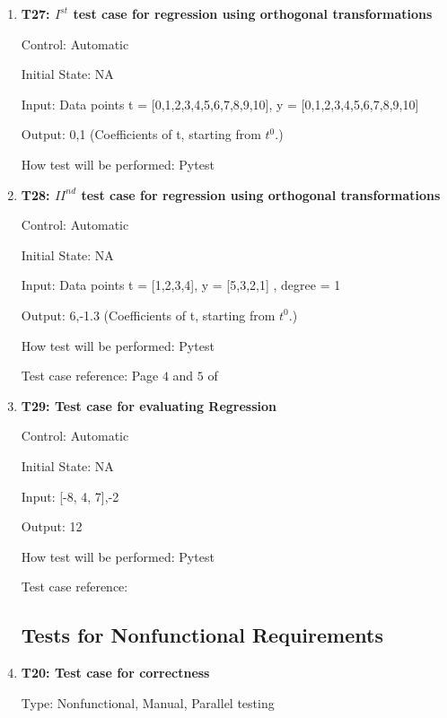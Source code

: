 \documentclass[12pt, titlepage]{article}
\begin{document}
\begin{enumerate}
\item{\textbf{T27: ${I}^{st}$ test case for regression using orthogonal 
transformations}\\}

Control: Automatic

Initial State: NA

Input: Data points t = [0,1,2,3,4,5,6,7,8,9,10], y = [0,1,2,3,4,5,6,7,8,9,10] 

Output: 0,1 (Coefficients of t, starting from $t^{0}$.)

How test will be performed: Pytest\\


\item{\textbf{T28: ${II}^{nd}$ test case for regression using orthogonal 
transformations}\\}

Control: Automatic

Initial State: NA

Input: Data points t = [1,2,3,4], y = [5,3,2,1] , degree = 1

Output: 6,-1.3 (Coefficients of t, starting from $t^{0}$.)

How test will be performed: Pytest

Test case reference: Page $4$ and $5$ of \cite{RegOrthogonal}\\

\item{\textbf{T29: Test case for evaluating Regression}}

Control: Automatic

Initial State: NA

Input: [-8, 4, 7],-2

Output: 12

How test will be performed: Pytest

Test case reference: \cite{RegAugmented}\\



\subsection{Tests for Nonfunctional Requirements}\label{NFRTesting}



\item{\textbf{T20: Test case for correctness}\\}

Type: Nonfunctional, Manual, Parallel testing
					

\end{enumerate}
\end{document}

